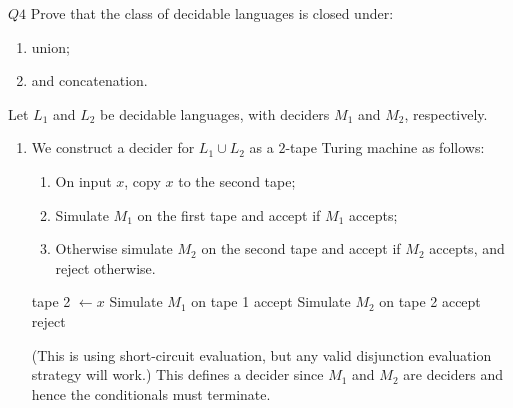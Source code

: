 \documentclass{article}
\theoremstyle{definition}
\theoremstyle{definition}
\theoremstyle{remark}
\begin{document}
\begin{questionbox}{$Q4$}
    Prove that the class of decidable languages is closed under:
    \begin{enumerate}
        \item[$(i)$] union;
        
        \item[$(ii)$] and concatenation.
    \end{enumerate}
\end{questionbox}

\bigskip

Let $L_1$ and $L_2$ be decidable languages, with deciders $M_1$ and $M_2$, respectively.
\begin{enumerate}
    \item[$(i)$] We construct a decider for $L_1\cup L_2$ as a $2$-tape Turing machine as follows:
    \begin{enumerate}
        \item[(1)] On input $x$, copy $x$ to the second tape;
        \item[(2)] Simulate $M_1$ on the first tape and accept if $M_1$ accepts;
        \item[(3)] Otherwise simulate $M_2$ on the second tape and accept if $M_2$ accepts, and reject otherwise.
    \end{enumerate}

    \begin{algorithm}[H]
    \caption{Decide Union}
    \begin{algorithmic}[1]
        \State tape 2 $\gets x$
        \State Simulate $M_1$ on tape 1
            \State\Return accept
        \Else
            \State Simulate $M_2$ on tape 2
                \State\Return accept
            \Else
                \State\Return reject
            \EndIf
        \EndIf
    \EndProcedure
    \end{algorithmic}
    \end{algorithm}

    (This is using short-circuit evaluation, but any valid disjunction evaluation strategy will work.) This defines a decider since $M_1$ and $M_2$ are deciders and hence the conditionals must terminate.



\end{enumerate}
\end{document}
